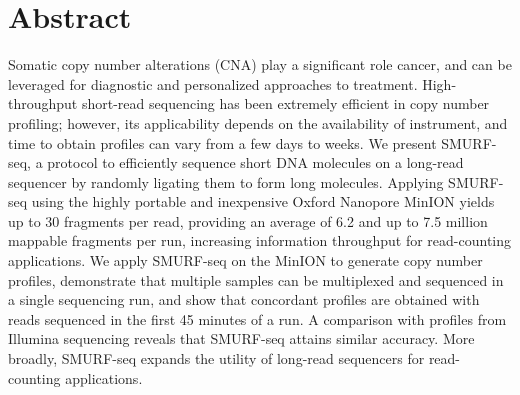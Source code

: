 \chapter*{Abstract}
Somatic copy number alterations (CNA) play a significant role cancer,
and can be leveraged for diagnostic and personalized approaches to
treatment.
%
High-throughput short-read sequencing has been extremely efficient in copy
number profiling; however, its applicability depends on the availability of
instrument, and time to obtain profiles can vary from a few days to weeks.
%
We present SMURF-seq, a protocol to efficiently sequence short DNA molecules
on a long-read sequencer by randomly ligating them to form long molecules.
Applying SMURF-seq using the highly portable and inexpensive Oxford Nanopore
MinION yields up to 30 fragments per read, providing an average of 6.2 and up
to 7.5 million mappable fragments per run, increasing information throughput
for read-counting applications. We apply SMURF-seq on the MinION to generate
copy number profiles, demonstrate that multiple samples can be multiplexed and
sequenced in a single sequencing run, and show that concordant profiles are
obtained with reads sequenced in the first 45 minutes of a run. A comparison
with profiles from Illumina sequencing reveals that SMURF-seq attains similar
accuracy.
%
More broadly, SMURF-seq expands the utility of long-read sequencers for
read-counting applications.
